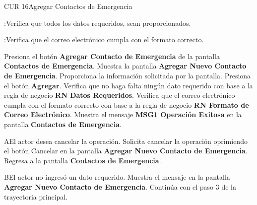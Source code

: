 \begin{UseCase}{CUR 16}{Agregar Contactos de Emergencia}
{            
            :Verifica que todos los datos requeridos, sean proporcionados.
            
            :Verifica que el correo electrónico cumpla con el formato correcto.
    }
 \end{UseCase}

 \begin{UCtrayectoria}
 	
 	\UCpaso [\UCactor] Presiona el botón \textbf{Agregar Contacto de Emergencia} de la pantalla \textbf{Contactos de Emergencia}.
 	\UCpaso Muestra la pantalla \textbf{Agregar Nuevo Contacto de Emergencia}.
 	\UCpaso [\UCactor] Proporciona la información solicitada por la pantalla.
 	\UCpaso [\UCactor] Presiona el botón \textbf{Agregar}.
	\UCpaso Verifica que no haga falta ningún dato requerido con base a la regla de negocio \textbf{RN Datos Requeridos}.
	\UCpaso Verifica que el correo electrónico cumpla con el formato correcto con base a la regla de negocio \textbf{RN Formato de Correo Electrónico}.
	\UCpaso Muestra el mensaje \textbf{MSG1 Operación Exitosa} en la pantalla \textbf{Contactos de Emergencia}.
    
 \end{UCtrayectoria}

 \begin{UCtrayectoriaA}{A}{El actor desea cancelar la operación.}
    \UCpaso[\UCactor] Solicita cancelar la operación oprimiendo el botón Cancelar en la pantalla \textbf{Agregar Nuevo Contacto de Emergencia}.
   \UCpaso Regresa a la pantalla \textbf{Contactos de Emergencia}.
 \end{UCtrayectoriaA}
 
 \begin{UCtrayectoriaA}{B}{El actor no ingresó un dato requerido.}
    \UCpaso[\UCsist] Muestra el mensaje  en la pantalla \textbf{Agregar Nuevo Contacto de Emergencia}.
    \UCpaso[] Continúa con el paso 3 de la trayectoria principal.
 \end{UCtrayectoriaA}
 
